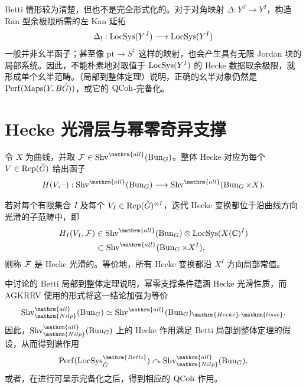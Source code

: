 Betti 情形较为清楚，但也不是完全形式化的。对于对角映射 $\Delta:Y^J\to Y^I$，构造 Ran 型余极限所需的左 Kan 延拓
\[\Delta_!:\operatorname{LocSys}(Y^J)\longrightarrow\operatorname{LocSys}(Y^I)\]
一般并非幺半函子；甚至像 $\mathrm{pt}\to S^1$ 这样的映射，也会产生具有无限 Jordan 块的局部系统。因此，不能朴素地对取值于 $\operatorname{LocSys}(Y^I)$ 的 Hecke 数据取余极限，就形成单个幺半范畴。（局部到整体定理）说明，正确的幺半对象仍然是 $\operatorname{Perf}(\operatorname{Maps}(Y,B\check{G}))$，或它的 $\operatorname{QCoh}$-完备化。

\section{Hecke 光滑层与幂零奇异支撑}\label{sec:12.4}
令 $X$ 为曲线，并取 $\cF\in\Shv^{\mathrm{all}}(\Bun_G)$。整体 Hecke 对应为每个 $V\in\operatorname{Rep}(\check{G})$ 给出函子
\[H(V,\text{--}):\Shv^{\mathrm{all}}(\Bun_G)\longrightarrow\Shv^{\mathrm{all}}(\Bun_G\times X).\]
\begin{definition*}{}
若对每个有限集合 $I$ 及每个 $V_I\in\operatorname{Rep}(\check{G})^{\otimes I}$，迭代 Hecke 变换都位于沿曲线方向光滑的子范畴中，即
\[\begin{split}
H_I(V_I,\cF)&\in\Shv^{\mathrm{all}}(\Bun_G)\otimes\LocSys(X(\mathbb C)^I)\\
&\subset\Shv^{\mathrm{all}}(\Bun_G\times X^I),
\end{split}\]
则称 $\mathcal{F}$ 是 Hecke 光滑的。等价地，所有 Hecke 变换都沿 $X^I$ 方向局部常值。
\end{definition*}

中讨论的 Betti 局部到整体定理说明，幂零支撑条件蕴涵 Hecke 光滑性质\cite{NY19}，而 AGKRRV 使用的形式将这一结论加强为等价\cite{AGK20a}
\[\Shv^{\mathrm{all}}_{\mathrm{Nilp}}(\Bun_G)\simeq\Shv^{\mathrm{all}}(\Bun_G)_{\mathrm{Hecke}\text{-}\mathrm{lisse}}.\]
因此，$\Shv^{\mathrm{all}}_{\mathrm{Nilp}}(\Bun_G)$ 上的 Hecke 作用满足 Betti 局部到整体定理的假设，从而得到谱作用
\[\operatorname{Perf}(\LocSys^{\mathrm{Betti}}_{\checkG})\curvearrowright\Shv^{\mathrm{all}}_{\mathrm{Nilp}}(\Bun_G),\]
或者，在进行可呈示完备化之后，得到相应的 $\operatorname{QCoh}$ 作用。

